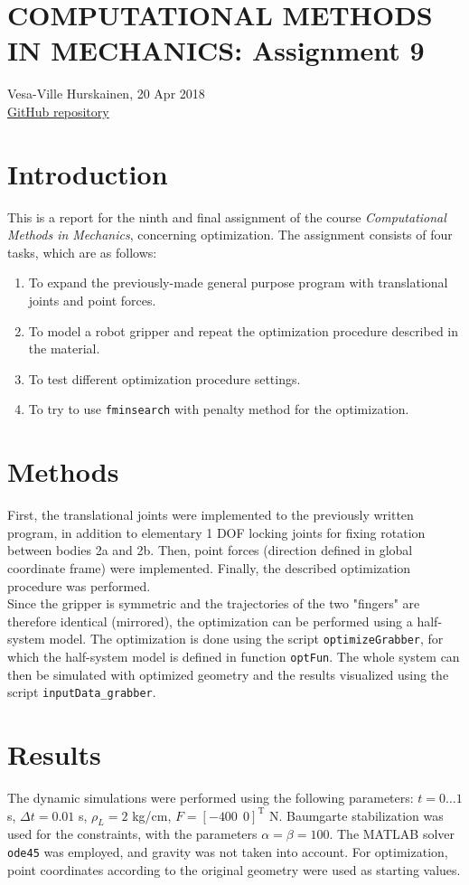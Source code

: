 \documentclass{article}
\begin{document}
\section*{COMPUTATIONAL METHODS IN MECHANICS: Assignment 9}
Vesa-Ville Hurskainen, 20 Apr 2018\\
\href{https://github.com/VesaVilleHurskainen/cmim2018}{GitHub repository}


\section*{Introduction}
This is a report for the ninth and final assignment of the course \textit{Computational Methods in Mechanics}, concerning optimization. The assignment consists of four tasks, which are as follows:
\begin{enumerate}
	\setlength\itemsep{0pt}
	\item To expand the previously-made general purpose program with translational joints and point forces.
	\item To model a robot gripper and repeat the optimization procedure described in the material.
	\item To test different optimization procedure settings.
	\item To try to use \texttt{fminsearch} with penalty method for the optimization.
\end{enumerate}

\section*{Methods}
First, the translational joints were implemented to the previously written program, in addition to elementary 1 DOF locking joints for fixing rotation between bodies 2a and 2b. Then, point forces (direction defined in global coordinate frame) were implemented. Finally, the described optimization procedure was performed.\\

Since the gripper is symmetric and the trajectories of the two "fingers" are therefore identical (mirrored), the optimization can be performed using a half-system model. The optimization is done using the script \texttt{optimizeGrabber}, for which the half-system model is defined in function \texttt{optFun}. The whole system can then be simulated with optimized geometry and the results visualized using the script \texttt{inputData\_grabber}.

\section*{Results}
The dynamic simulations were performed using the following parameters: $t = 0 \dots 1$ s, $\Delta t = 0.01$ s, $\rho_L = 2$ kg/cm, $F = [-400~~0]^\text{T}$ N. Baumgarte stabilization was used for the constraints, with the parameters $\alpha = \beta = 100$. The MATLAB solver \texttt{ode45} was employed, and gravity was not taken into account. For optimization, point coordinates according to the original geometry were used as starting values.\\
\end{document}

